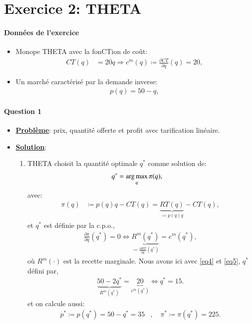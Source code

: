 \section{Exercice 2: THETA }
\frame{\sectionpage}
\begin{frame}
[allowframebreaks]{\insertsection}
\framesubtitle{Données de l'exercice \\}
\begin{itemize}
    \item Monope THETA avec la fonCTion de coût:
    \begin{align}
    CT(q) &= 20q \Rightarrow c^m(q) \coloneqq \frac{\partial CT}{\partial q}(q) = 20,
    \label{eq4}
    \end{align}
   \item Un marché caractérisé par la demande inverse:
   \begin{align}
     p(q)=50-q,
     \label{eq5}
   \end{align}
\end{itemize}
    \end{frame}
    
     \begin{frame}
  [allowframebreaks]{\insertsection}
  \framesubtitle{Question 1\\}
  \begin{itemize}
\item \textbf{\underline{Problème}}:  prix, quantité offerte et profit avec tarification linéaire.
    \item \textbf{\underline{Solution}}: 
  \begin{enumerate}[$\cdot$]
    \item THETA choisit la quantité optimale $q^*$ comme solution de:
    \begin{align*}
      q^* &= \argmax_q \pi(q),
    \end{align*}
    avec:
    \begin{align*}
      \pi(q) &\coloneqq p(q)q - CT(q) = \underbrace{RT(q)}_{\coloneqq p(q)q} - CT(q),
    \end{align*}
    et $q^*$ est définie par la c.p.o.,
    \begin{align}
      \frac{\partial \pi}{\partial q}(q^*) = 0 \Leftrightarrow \underbrace{R^m(q^*)}_{\coloneqq \frac{\partial RT}{\partial q}(q^*)} 
      = c^m(q^*),
      \label{eq6}
    \end{align}
    où  $R^m(\cdot)$ est la recette marginale. 
    \medskip
    Nous avons ici avec \eqref{eq4} et \eqref{eq5}, $q^*$ défini par,
    \begin{align*}
      \underbrace{50-2q^*}_{R^m(q^*)} = \underbrace{20}_{c^m(q^*)} \Leftrightarrow q^* = 15.
    \end{align*}
    et on calcule aussi:
    \begin{align*}
      p^* \coloneqq p(q^*) = 50-q^* = 35 &, \quad \pi^* \coloneqq\pi(q^*) = 225.
    \end{align*}
  \end{enumerate}
  \end{itemize}
    \end{frame}
    
